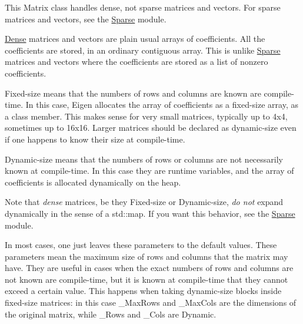 \begin{DoxyDescription}
\item[{\bfseries{\label{class_eigen_1_1_matrix_dense}%
\Hypertarget{class_eigen_1_1_matrix_dense}%
\mbox{\hyperlink{struct_eigen_1_1_dense}{Dense}} versus sparse\+:}} ]This Matrix class handles dense, not sparse matrices and vectors. For sparse matrices and vectors, see the \mbox{\hyperlink{struct_eigen_1_1_sparse}{Sparse}} module.

\mbox{\hyperlink{struct_eigen_1_1_dense}{Dense}} matrices and vectors are plain usual arrays of coefficients. All the coefficients are stored, in an ordinary contiguous array. This is unlike \mbox{\hyperlink{struct_eigen_1_1_sparse}{Sparse}} matrices and vectors where the coefficients are stored as a list of nonzero coefficients.


\item[{\bfseries{\label{class_eigen_1_1_matrix_fixedsize}%
\Hypertarget{class_eigen_1_1_matrix_fixedsize}%
Fixed-\/size versus dynamic-\/size\+:}} ]Fixed-\/size means that the numbers of rows and columns are known are compile-\/time. In this case, Eigen allocates the array of coefficients as a fixed-\/size array, as a class member. This makes sense for very small matrices, typically up to 4x4, sometimes up to 16x16. Larger matrices should be declared as dynamic-\/size even if one happens to know their size at compile-\/time.

Dynamic-\/size means that the numbers of rows or columns are not necessarily known at compile-\/time. In this case they are runtime variables, and the array of coefficients is allocated dynamically on the heap.

Note that {\itshape dense} matrices, be they Fixed-\/size or Dynamic-\/size, {\itshape do not} expand dynamically in the sense of a std\+::map. If you want this behavior, see the \mbox{\hyperlink{struct_eigen_1_1_sparse}{Sparse}} module.


\item[{\bfseries{\label{class_eigen_1_1_matrix_maxrows}%
\Hypertarget{class_eigen_1_1_matrix_maxrows}%
\+\_\+\+Max\+Rows and \+\_\+\+Max\+Cols\+:}} ]In most cases, one just leaves these parameters to the default values. These parameters mean the maximum size of rows and columns that the matrix may have. They are useful in cases when the exact numbers of rows and columns are not known are compile-\/time, but it is known at compile-\/time that they cannot exceed a certain value. This happens when taking dynamic-\/size blocks inside fixed-\/size matrices\+: in this case \+\_\+\+Max\+Rows and \+\_\+\+Max\+Cols are the dimensions of the original matrix, while \+\_\+\+Rows and \+\_\+\+Cols are Dynamic. 
\end{DoxyDescription}

